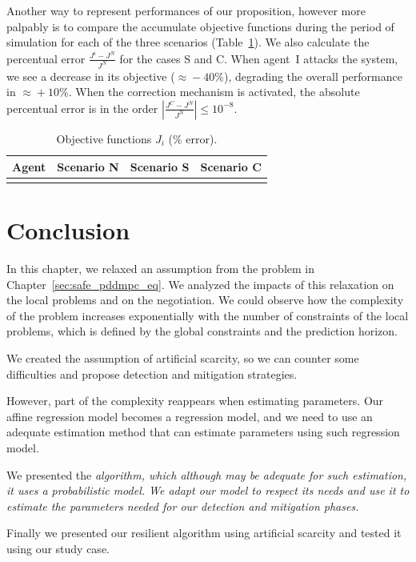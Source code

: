 \documentclass[../main.tex]{subfiles}
\begin{document}
Another way to represent performances of our proposition, however more palpably is to compare the accumulate objective functions during the period of simulation for each of the three scenarios (Table~\ref{tab:costsGlobalLocal}).
We also calculate the percentual error ${\frac{J^{i}-J^{N}}{J^{N}}}$ for the cases S and C.
When agent~I attacks the system, we see a decrease in its objective ($\approx\!-40\%$), degrading the overall performance in $\approx\!+10\%$.
When the correction mechanism is activated, the absolute percentual error is in the order ${|\frac{J^{C}-J^{N}}{J^{N}}|\leq10^{-8}}$.

\begin{table}[h]
  \centering
  \caption{Objective functions $J_{i}$ (\% error).}\label{tab:costsGlobalLocal}
  \begin{tabular}[t]{cccc}
    \toprule
    Agent  & Scenario N& Scenario S & Scenario C\\
    \midrule
    \\
    \bottomrule
  \end{tabular}
\end{table}

\section{Conclusion}\label{sec:conclusion}
In this chapter, we relaxed an assumption from the problem in Chapter~\ref{sec:safe_pddmpc_eq}. We analyzed the impacts of this relaxation on the local problems and on the negotiation.
We could observe how the complexity of the problem increases exponentially with the number of constraints of the local problems, which is defined by the global constraints and the prediction horizon.

We created the assumption of artificial scarcity, so we can counter some difficulties and propose detection and mitigation strategies.

However, part of the complexity reappears when estimating parameters.
Our affine regression model becomes a \pwa{} regression model, and we need to use an adequate estimation method that can estimate parameters using such regression model.

We presented the \em{} algorithm,  which although may be adequate for such estimation, it uses a probabilistic model. We adapt our model to respect its needs and use it to estimate the parameters needed for our detection and mitigation phases.

Finally we presented our resilient algorithm using artificial scarcity and tested it using our \dhn{} study case.

\end{document}
